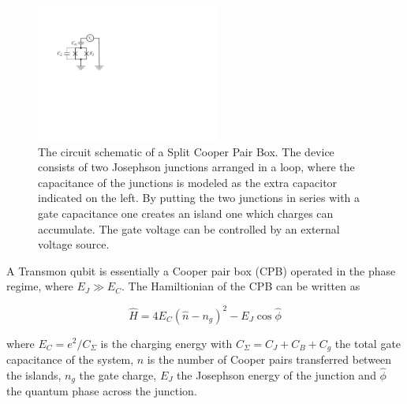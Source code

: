 \begin{figure}
	\includegraphics[width=6cm]{"./material/figures/introduction/cooper_pair_box"}
	\caption{The circuit schematic of a Split Cooper Pair Box. The device consists of two Josephson junctions arranged in a loop, where the capacitance of the junctions is modeled as the extra capacitor indicated on the left. By putting the two junctions in series with a gate capacitance one creates an island one which charges can accumulate. The gate voltage can be controlled by an external voltage source.}
	\label{fig:SampleCircuit}
\end{figure}

A Transmon qubit is essentially a Cooper pair box (CPB) operated in the phase regime, where $E_J \gg E_C$. The Hamiltionian of the CPB can be written as \citep{cottet_implementation_2002}

\begin{equation}
\hat{H} = 4 E_C \left( \hat{n} - n_g\right)^2-E_J \cos{\hat{\phi}}
\end{equation}

where $E_C = e^2 / C_\Sigma$ is the charging energy with $C_\Sigma = C_J+C_B+C_g$ the total gate capacitance of the system, $\hat{n}$ is the number of Cooper pairs transferred between the islands, $n_g$ the gate charge, $E_J$ the Josephson energy of the junction and $\hat{\phi}$ the quantum phase across the junction.

\smallskip

